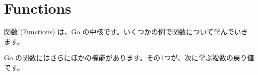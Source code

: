 \section{Functions}

関数 (Functions) は、Go の中核です。いくつかの例で関数について学んでいきます。




Go の関数にはさらにほかの機能があります。その1つが、次に学ぶ複数の戻り値です。